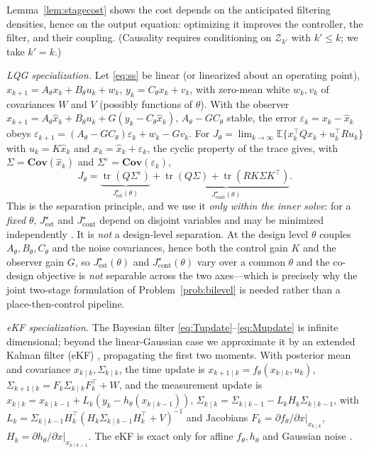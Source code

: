 \documentclass[twocolumn,amsthm]{autart}
\begin{document}
Lemma~\ref{lem:stagecost} shows the cost depends on the anticipated filtering
densities, hence on the output equation: optimizing it improves the controller,
the filter, and their coupling. (Causality requires conditioning on
$\mathcal{Z}_{k'}$ with $k' \le k$; we take $k' = k$.)

\emph{LQG specialization.}
Let \eqref{eq:ss} be linear (or linearized about an operating point),
$x_{k+1} = A_\theta x_k + B_\theta u_k + w_k$, $y_k = C_\theta x_k + v_k$, with
zero-mean white $w_k, v_k$ of covariances $W$ and $V$ (possibly functions of
$\theta$). With the observer
$\hat x_{k+1} = A_\theta \hat x_k + B_\theta u_k + G(y_k - C_\theta \hat x_k)$,
$A_\theta - G C_\theta$ stable, the error
$\varepsilon_k = x_k - \hat x_k$ obeys
$\varepsilon_{k+1} = (A_\theta - G C_\theta)\varepsilon_k + w_k - G v_k$.
For $J_\theta = \lim_{k\to\infty} \mathbb{E}\{ x_k^\top Q x_k + u_k^\top R u_k\}$
with $u_k = K\hat x_k$ and $x_k = \hat x_k + \varepsilon_k$, the cyclic property
of the trace gives, with $\Sigma = \mathbf{Cov}(\hat x_k)$ and
$\Sigma^\varepsilon = \mathbf{Cov}(\varepsilon_k)$,
\begin{equation}
J_\theta = \underbrace{\operatorname{tr}(Q\Sigma^\varepsilon)}_{J_{\mathrm{est}}^\star(\theta)}
+ \underbrace{\operatorname{tr}(Q\Sigma) + \operatorname{tr}(R K \Sigma K^\top)}_{J_{\mathrm{cont}}^\star(\theta)}.
\end{equation}
This is the separation principle, and we use it \emph{only within the inner
solve}: for a \emph{fixed} $\theta$, $J_{\mathrm{est}}^\star$ and $J_{\mathrm{cont}}^\star$
depend on disjoint variables and may be minimized independently
\cite{tzoumas2021lqg}. It is \emph{not} a design-level separation. At the design
level $\theta$ couples $A_\theta, B_\theta, C_\theta$ and the noise covariances,
hence both the control gain $K$ and the observer gain $G$, so
$J_{\mathrm{est}}^\star(\theta)$ and $J_{\mathrm{cont}}^\star(\theta)$ vary over a common
$\theta$ and the co-design objective is \emph{not} separable across the two
axes---which is precisely why the joint two-stage formulation of
Problem~\ref{prob:bilevel} is needed rather than a place-then-control pipeline.

\emph{eKF specialization.} The Bayesian filter \eqref{eq:Tupdate}--\eqref{eq:Mupdate} is infinite dimensional; beyond the linear-Gaussian case we approximate it by an extended Kalman filter (eKF) \cite{anderson2012optimal,ramadan2024extended},
propagating the first two moments. With posterior mean and covariance
$x_{k\mid k}, \Sigma_{k\mid k}$, the time update is
$x_{k+1\mid k} = f_\theta(x_{k\mid k},u_k)$,
$\Sigma_{k+1\mid k} = F_k \Sigma_{k\mid k} F_k^\top + W$, and the
measurement update is
$x_{k\mid k} = x_{k\mid k-1} + L_k(y_k - h_\theta(x_{k\mid k-1}))$,
$\Sigma_{k\mid k} = \Sigma_{k\mid k-1} - L_k H_k \Sigma_{k\mid k-1}$, with
$L_k = \Sigma_{k\mid k-1} H_k^\top (H_k \Sigma_{k\mid k-1} H_k^\top +
V)^{-1}$ and Jacobians
$F_k = \partial f_\theta/\partial x |_{x_{k\mid k}}$,
$H_k = \partial h_\theta/\partial x |_{x_{k\mid k-1}}$. The eKF is exact only for
affine $f_\theta, h_\theta$ and Gaussian noise \cite{anderson2012optimal}.
\end{document}
